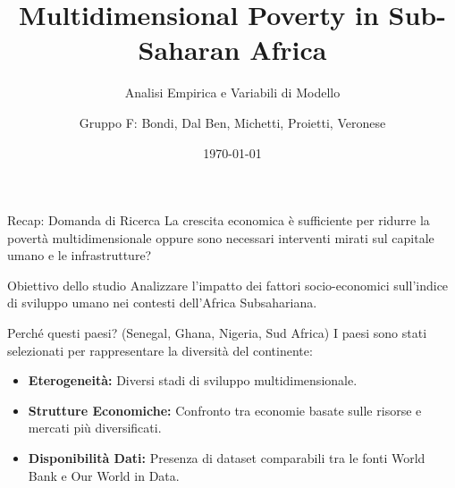 \documentclass{beamer}
\title{Multidimensional Poverty in Sub-Saharan Africa}
\subtitle{Analisi Empirica e Variabili di Modello}
\author{Gruppo F: Bondi, Dal Ben, Michetti, Proietti, Veronese}
\date{\today}
\begin{document}
    
    \begin{frame}
        \titlepage
    \end{frame}
    
    \begin{frame}{Recap: Domanda di Ricerca}
        La crescita economica è sufficiente per ridurre la povertà multidimensionale oppure sono necessari interventi mirati sul capitale umano e le infrastrutture?
        \vspace{0.5cm}
        \begin{block}{Obiettivo dello studio}
            Analizzare l'impatto dei fattori socio-economici sull'indice di sviluppo umano nei contesti dell'Africa Subsahariana.
        \end{block}
    \end{frame}
    
    \begin{frame}{Perché questi paesi? (Senegal, Ghana, Nigeria, Sud Africa)}
        I paesi sono stati selezionati per rappresentare la diversità del continente:
        \begin{itemize}
            \item \textbf{Eterogeneità:} Diversi stadi di sviluppo multidimensionale.
            \item \textbf{Strutture Economiche:} Confronto tra economie basate sulle risorse e mercati più diversificati.
            \item \textbf{Disponibilità Dati:} Presenza di dataset comparabili tra le fonti World Bank e Our World in Data.
        \end{itemize}
    \end{frame}
    
\end{document}
